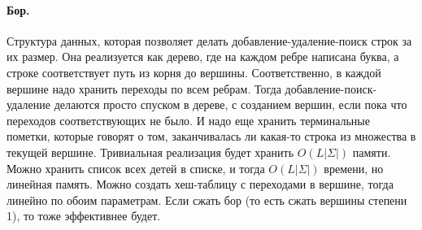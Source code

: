 \documentclass[12pt]{article}
\begin{document}
\paragraph{Бор.} Структура данных, которая позволяет делать добавление-удаление-поиск строк за их размер. Она реализуется как дерево, где на каждом ребре написана буква, а строке соответствует путь из корня до вершины. Соответственно, в каждой вершине надо хранить переходы по всем ребрам. Тогда добавление-поиск-удаление делаются просто спуском в дереве, с созданием вершин, если пока что переходов соответствующих не было. И надо еще хранить терминальные пометки, которые говорят о том, заканчивалась ли какая-то строка из множества в текущей вершине. Тривиальная реализация будет хранить $O(L|\Sigma|)$ памяти. Можно хранить список всех детей в списке, и тогда $O(L |
\Sigma|)$ времени, но линейная память. Можно создать хеш-таблицу с переходами в вершине, тогда линейно по обоим параметрам. Если сжать бор (то есть сжать вершины степени 1), то тоже эффективнее будет.
\end{document}
